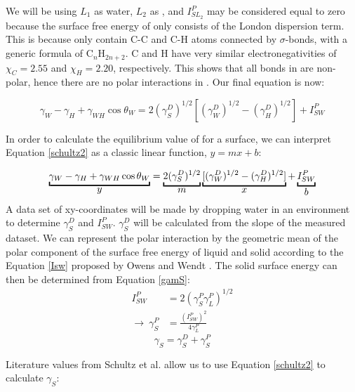 We will be using $L_{1}$ as water, $L_{2}$ as \nalk[s], and $I_{SL_{2}}^{P}$ may be considered equal to zero because the surface free energy of \nalk[s] only consists of the London dispersion term. This is because \nalk[s] only contain C-C and C-H atoms connected by $\sigma$-bonds, with a generic formula of C$_{n}$H$_{2n+2}$. C and H have very similar electronegativities of $\chi_{C}=2.55$ and $\chi_{H}=2.20$, respectively. This shows that all bonds in \nalk[s] are non-polar, hence there are no polar interactions in \nalk[s]. Our final equation is now:

\begin{equation} 
\label{schultz2}
	\gamma_{W}-\gamma_{H}+\gamma_{WH}\cos\theta_{W} = 2(\gamma_{S}^{D})^{1/2}  [(\gamma_{W}^{D})^{1/2}-(\gamma_{H}^{D})^{1/2}] + I_{SW}^{P} 
\end{equation} 

In order to calculate the equilibrium value of \gamSV for a surface, we can interpret Equation \ref{schultz2} as a classic linear function, $y = mx + b$:

\[
\underbracket{\gamma_{W}-\gamma_{H}+\gamma_{WH}\cos\theta_{W}}_{\text{\normalsize{$y$}}} =
\underbracket{2(\gamma_{S}^{D})^{1/2}}_{\text{\normalsize{$m$}}}  
\underbracket{[(\gamma_{W}^{D})^{1/2}-(\gamma_{H}^{D})^{1/2}] }_{\text{\normalsize{$x$}}} + 
\underbracket{I_{SW}^{P}}_{\text{\normalsize{$b$}}} 
\] 
A data set of xy-coordinates will be made by dropping water in an \nalk environment to determine $\gamma_{S}^{D}$ and $I_{SW}^{P} $. $\gamma_{S}^{D} $ will be calculated from the slope of the measured dataset. We can represent the polar interaction by the geometric mean of the polar component of the surface free energy of liquid and solid according to the Equation \ref{Isw} proposed by Owens and Wendt \cite{Owens1969}. The solid surface energy can then be determined from Equation \ref{gamS}:
\begin{equation}
\label{Isw}
	\begin{split}
	I_{SW}^{P} 							& = 2 (\gamma_{S}^{P}\gamma_{L}^{P})^{1/2} \\
	\rightarrow ~ \gamma_{S}^{P}	& = \frac{(I_{SW}^{P})^{2} }{4\gamma_{L}^{P}} 
	\end{split}
\end{equation}
\begin{equation}
\label{gamS}	\gamma_{S} = \gamma_{S}^{D} + \gamma_{S}^{P}	
\end{equation}

Literature values from Schultz et al.\cite{Schultz1977} allow us to use Equation \ref{schultz2} to calculate $\gamma_{S}$:

